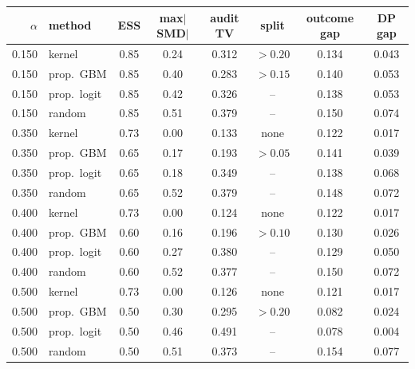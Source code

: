\begin{tabular}{rlcccccc}
\toprule
$\alpha$ & method & ESS & max$|$SMD$|$ & audit TV & split & outcome gap & DP gap \\
\midrule
0.150 & kernel & 0.85 & 0.24 & 0.312 & $>0.20$ & 0.134 & 0.043 \\
0.150 & prop.\ GBM & 0.85 & 0.40 & 0.283 & $>0.15$ & 0.140 & 0.053 \\
0.150 & prop.\ logit & 0.85 & 0.42 & 0.326 & -- & 0.138 & 0.053 \\
0.150 & random & 0.85 & 0.51 & 0.379 & -- & 0.150 & 0.074 \\
\midrule
0.350 & kernel & 0.73 & 0.00 & 0.133 & none & 0.122 & 0.017 \\
0.350 & prop.\ GBM & 0.65 & 0.17 & 0.193 & $>0.05$ & 0.141 & 0.039 \\
0.350 & prop.\ logit & 0.65 & 0.18 & 0.349 & -- & 0.138 & 0.068 \\
0.350 & random & 0.65 & 0.52 & 0.379 & -- & 0.148 & 0.072 \\
\midrule
0.400 & kernel & 0.73 & 0.00 & 0.124 & none & 0.122 & 0.017 \\
0.400 & prop.\ GBM & 0.60 & 0.16 & 0.196 & $>0.10$ & 0.130 & 0.026 \\
0.400 & prop.\ logit & 0.60 & 0.27 & 0.380 & -- & 0.129 & 0.050 \\
0.400 & random & 0.60 & 0.52 & 0.377 & -- & 0.150 & 0.072 \\
\midrule
0.500 & kernel & 0.73 & 0.00 & 0.126 & none & 0.121 & 0.017 \\
0.500 & prop.\ GBM & 0.50 & 0.30 & 0.295 & $>0.20$ & 0.082 & 0.024 \\
0.500 & prop.\ logit & 0.50 & 0.46 & 0.491 & -- & 0.078 & 0.004 \\
0.500 & random & 0.50 & 0.51 & 0.373 & -- & 0.154 & 0.077 \\
\bottomrule
\end{tabular}
